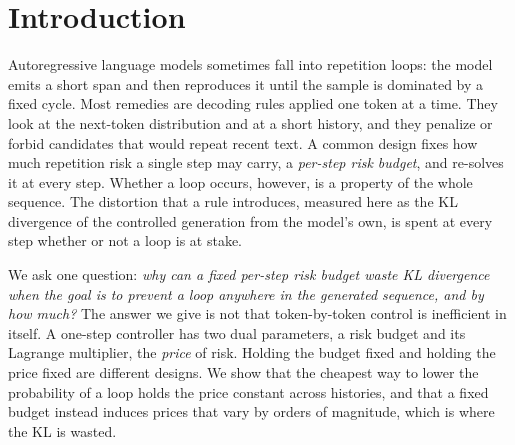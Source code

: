 \section{Introduction}\label{sec:intro}

Autoregressive language models sometimes fall into repetition loops: the model emits a short span and then reproduces it until the sample is dominated by a fixed cycle. Most remedies are decoding rules applied one token at a time. They look at the next-token distribution and at a short history, and they penalize or forbid candidates that would repeat recent text. A common design fixes how much repetition risk a single step may carry, a \emph{per-step risk budget}, and re-solves it at every step. Whether a loop occurs, however, is a property of the whole sequence. The distortion that a rule introduces, measured here as the KL divergence of the controlled generation from the model's own, is spent at every step whether or not a loop is at stake.

We ask one question: \emph{why can a fixed per-step risk budget waste KL divergence when the goal is to prevent a loop anywhere in the generated sequence, and by how much?} The answer we give is not that token-by-token control is inefficient in itself. A one-step controller has two dual parameters, a risk budget and its Lagrange multiplier, the \emph{price} of risk. Holding the budget fixed and holding the price fixed are different designs. We show that the cheapest way to lower the probability of a loop holds the price constant across histories, and that a fixed budget instead induces prices that vary by orders of magnitude, which is where the KL is wasted.

